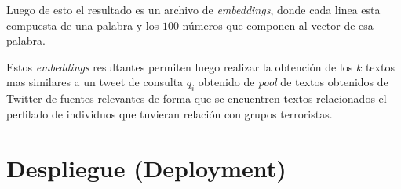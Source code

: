 Luego de esto el resultado es un archivo de \emph{embeddings}, donde cada linea esta compuesta de una palabra y los $100$ números que componen al vector de esa palabra.

Estos \emph{embeddings} resultantes permiten luego realizar la obtención de los $k$ textos mas similares a un tweet de consulta $q_i$ obtenido de \emph{pool} de textos obtenidos de Twitter de fuentes relevantes de forma que se encuentren textos relacionados el perfilado de individuos que tuvieran relación con grupos terroristas.

\section{Despliegue (Deployment)}
